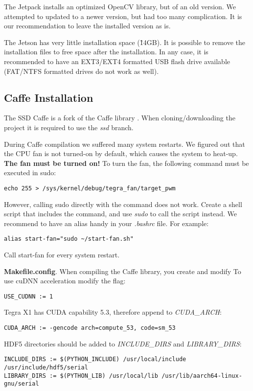 The Jetpack installs an optimized OpenCV library, but of an old version. We attempted to updated to a newer version, but had too many complication. It is our recommendation to leave the installed version as is.

The Jetson has very little installation space (\~14GB). It is possible to remove the installation files to free space after the installation. In any case, it is recommended to have an EXT3/EXT4 formatted USB flash drive available (FAT/NTFS formatted drives do not work as well). 

\subsection{Caffe Installation}

The SSD Caffe \cite{caffessd} is a fork of the Caffe library \cite{caffeoriginal}. When cloning/downloading the project it is required to use the \textit{ssd} branch.

During Caffe compilation we suffered many system restarts. We figured out that the CPU fan is not turned-on by default, which causes the system to heat-up. \textbf{The fan must be turned on!} To turn the fan, the following command must be executed in sudo:
\begin{lstlisting} 
echo 255 > /sys/kernel/debug/tegra_fan/target_pwm
\end{lstlisting}
However, calling sudo directly with the command does not work. Create a shell script that includes the command, and use \textit{sudo} to call the script instead. We recommend to have an alias handy in your \textit{.bashrc} file. For example:
\begin{lstlisting} 
alias start-fan="sudo ~/start-fan.sh"
\end{lstlisting}
Call start-fan for every system restart.

\textbf{Makefile.config}. 
When compiling the Caffe library, you create and modify 
To use cuDNN acceleration modify the flag:
\begin{lstlisting} 
USE_CUDNN := 1
\end{lstlisting}

Tegra X1 has CUDA capability 5.3, therefore append to \textit{CUDA\_ARCH}: 
\begin{lstlisting} 
CUDA_ARCH := -gencode arch=compute_53, code=sm_53
\end{lstlisting}

HDF5 directories should be added to \textit{INCLUDE\_DIRS} and \textit{LIBRARY\_DIRS}:
\begin{lstlisting} 
INCLUDE_DIRS := $(PYTHON_INCLUDE) /usr/local/include /usr/include/hdf5/serial
LIBRARY_DIRS := $(PYTHON_LIB) /usr/local/lib /usr/lib/aarch64-linux-gnu/serial
\end{lstlisting}

